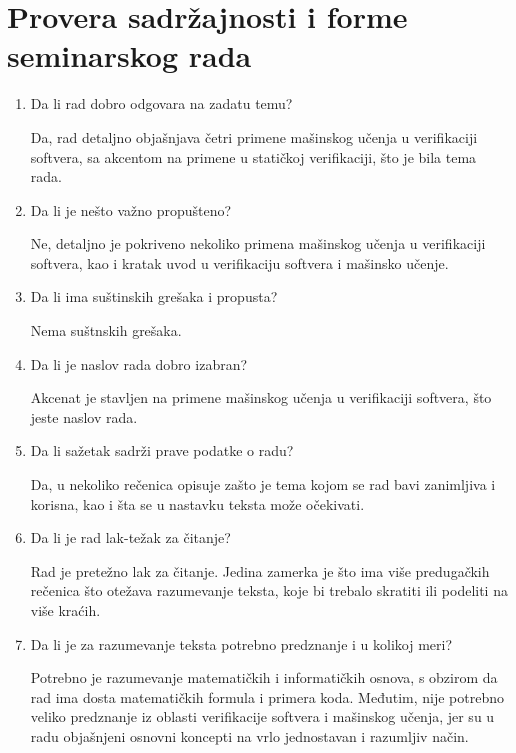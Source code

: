 \documentclass[a4paper]{report}
\begin{document}
\section{Provera sadržajnosti i forme seminarskog rada}

\begin{enumerate}
\item Da li rad dobro odgovara na zadatu temu?

Da, rad detaljno objašnjava četri primene mašinskog učenja u verifikaciji softvera, sa akcentom na primene u statičkoj verifikaciji, što je bila tema rada.

\item Da li je nešto važno propušteno?

Ne, detaljno je pokriveno nekoliko primena mašinskog učenja u verifikaciji softvera, kao i kratak uvod u verifikaciju softvera i mašinsko učenje.

\item Da li ima suštinskih grešaka i propusta?

Nema suštnskih grešaka.

\item Da li je naslov rada dobro izabran?

Akcenat je stavljen na primene mašinskog učenja u verifikaciji softvera, što jeste naslov rada.

\item Da li sažetak sadrži prave podatke o radu?

Da, u nekoliko rečenica opisuje zašto je tema kojom se rad bavi zanimljiva i korisna, kao i šta se u nastavku teksta može očekivati.

\item Da li je rad lak-težak za čitanje?

Rad je pretežno lak za čitanje. Jedina zamerka je što ima više predugačkih rečenica što otežava razumevanje teksta, koje bi trebalo skratiti ili podeliti na više kraćih.

\item Da li je za razumevanje teksta potrebno predznanje i u kolikoj meri?

Potrebno je razumevanje matematičkih i informatičkih osnova, s obzirom da rad ima dosta matematičkih formula i primera koda. Međutim, nije potrebno veliko predznanje iz oblasti verifikacije softvera i mašinskog učenja, jer su u radu objašnjeni osnovni koncepti na vrlo jednostavan i razumljiv način.


\end{enumerate}
\end{document}
